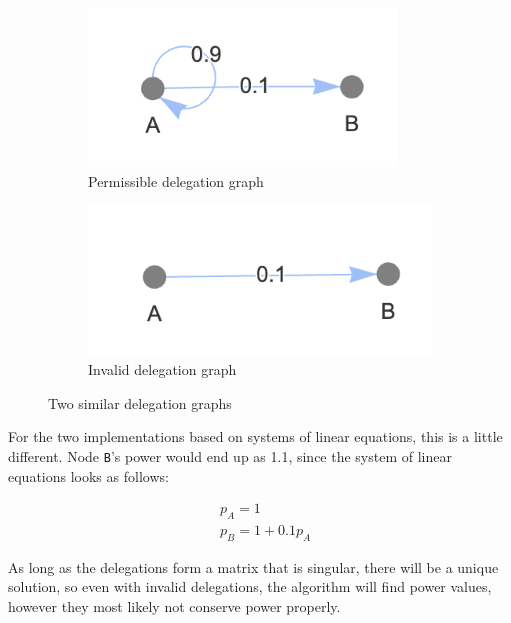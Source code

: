 \begin{figure}[h]
    \centering
    \begin{subfigure}[t]{0.45\textwidth}
	\centering
	\includegraphics[width=0.9\textwidth]{allowed_self_loop}
	\caption{Permissible delegation graph}
	\label{subfig:permissible-self-delegation}
    \end{subfigure}
    \hfill
    \begin{subfigure}[t]{0.45\textwidth}
        \centering
        \includegraphics[width=\textwidth]{invalid_delegation_graph}
        \caption{Invalid delegation graph}
         \label{subfig:invalid-delegation-graph}
    \end{subfigure}
    \caption{Two similar delegation graphs}
    \label{fig:small-delegation-graphs}
\end{figure}

For the two implementations based on systems of linear equations, this is a little different. Node \texttt{B}'s power would end up as 1.1, since the system of linear equations looks as follows:

\begin{align*}
& p_A = 1 \\
& p_B = 1 + 0.1p_A
\end{align*}

As long as the delegations form a matrix that is singular, there will be a unique solution, so even with invalid delegations, the algorithm will find power values, however they most likely not conserve power properly. 

